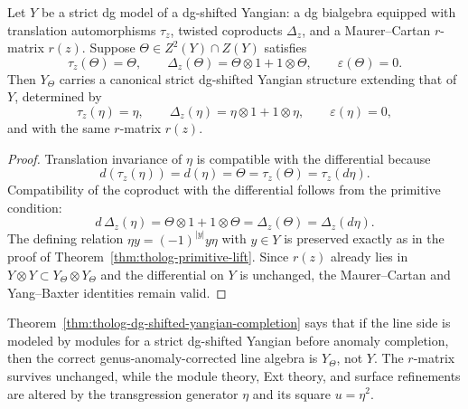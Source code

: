 \begin{theorem}
Let \(Y\) be a strict dg model of a dg-shifted Yangian: a dg bialgebra equipped with translation automorphisms \(\tau_{z}\), twisted coproducts \(\Delta_{z}\), and a Maurer--Cartan \(r\)-matrix \(r(z)\).
Suppose \(\Theta\in Z^{2}(Y)\cap Z(Y)\) satisfies
\[
\tau_{z}(\Theta)=\Theta,\qquad
\Delta_{z}(\Theta)=\Theta\otimes 1+1\otimes \Theta,\qquad
\varepsilon(\Theta)=0.
\]
Then \(Y_{\Theta}\) carries a canonical strict dg-shifted Yangian structure extending that of \(Y\), determined by
\[
\tau_{z}(\eta)=\eta,\qquad
\Delta_{z}(\eta)=\eta\otimes 1+1\otimes \eta,\qquad
\varepsilon(\eta)=0,
\]
and with the same \(r\)-matrix \(r(z)\).
\end{theorem}

\begin{proof}
Translation invariance of \(\eta\) is compatible with the differential because
\[
d(\tau_{z}(\eta))=d(\eta)=\Theta=\tau_{z}(\Theta)=\tau_{z}(d\eta).
\]
Compatibility of the coproduct with the differential follows from the primitive condition:
\[
d\,\Delta_{z}(\eta)=\Theta\otimes 1+1\otimes \Theta=\Delta_{z}(\Theta)=\Delta_{z}(d\eta).
\]
The defining relation \(\eta y=(-1)^{|y|}y\eta\) with \(y\in Y\) is preserved exactly as in the proof of Theorem~\ref{thm:tholog-primitive-lift}.
Since \(r(z)\) already lies in \(Y\otimes Y\subset Y_{\Theta}\otimes Y_{\Theta}\) and the differential on \(Y\) is unchanged, the Maurer--Cartan and Yang--Baxter identities remain valid.
\end{proof}

\begin{remark}[Interpretation]
Theorem~\ref{thm:tholog-dg-shifted-yangian-completion} says that if the line side is modeled by modules for a strict dg-shifted Yangian before anomaly completion, then the correct genus-anomaly-corrected line algebra is \(Y_{\Theta}\), not \(Y\).
The \(r\)-matrix survives unchanged, while the module theory, Ext theory, and surface refinements are altered by the transgression generator \(\eta\) and its square \(u=\eta^{2}\).
\end{remark}

